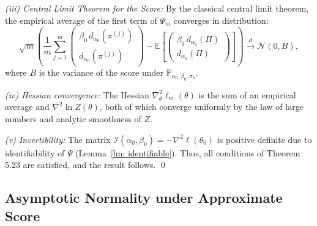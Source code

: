 \documentclass{article}
\begin{document}
\textit{(iii) Central Limit Theorem for the Score:} 
By the classical central limit theorem, the empirical average of the first term of $\Psi_m$ converges in distribution:
\[
\sqrt{m} \left( \frac{1}{m} \sum_{j=1}^m \begin{pmatrix} \beta_0 \, \dot{d}_{\alpha_0}(\pi^{(j)}) \\ d_{\alpha_0}(\pi^{(j)}) \end{pmatrix} - \mathbb{E} \left[ \begin{pmatrix} \beta_0 \, \dot{d}_{\alpha_0}(\Pi) \\ d_{\alpha_0}(\Pi) \end{pmatrix} \right] \right)
\xrightarrow{d} \mathcal{N}(0, B),
\]
where \(B\) is the variance of the score under \(\mathbb{P}_{\alpha_0, \beta_0, \sigma_0}\).

\textit{(iv) Hessian convergence:} The Hessian \(\nabla^2_\theta \ell_m(\theta)\) is the sum of an empirical average and \(\nabla^2 \ln Z(\theta)\), both of which converge uniformly by the law of large numbers and analytic smoothness of \(Z\).

\textit{(v) Invertibility:} The matrix \(\mathcal{I}(\alpha_0, \beta_0) = -\nabla^2 \ell(\theta_0)\) is positive definite due to identifiability of $\Psi$ (Lemma~\ref{lm: identifiable}).
Thus, all conditions of Theorem 5.23 are satisfied, and the result follows. \qed

\subsection{Asymptotic Normality under Approximate Score}
\end{document}
